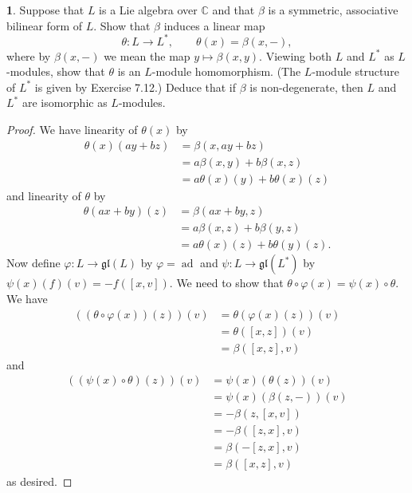\documentclass[12pt]{article}
\DeclareMathOperator{\ad}{ad}
\newcommand{\gl}{\mathfrak{gl}}
\theoremstyle{definition}
\newtheorem{ex}{}
\begin{document}
\begin{ex}
	Suppose that $L$ is a Lie algebra over $\mathbb{C}$ and that $\beta$ is a symmetric, associative bilinear form of $L$.
	Show that $\beta$ induces a linear map \begin{equation*}
		\theta : L \to L^*, \hspace{2em} \theta(x) = \beta(x, -),
	\end{equation*}
	where by $\beta(x, -)$ we mean the map $y \mapsto \beta(x, y)$.
	Viewing both $L$ and $L^*$ as $L$-modules, show that $\theta$ is an $L$-module homomorphism.
	(The $L$-module structure of $L^*$ is given by Exercise 7.12.)
	Deduce that if $\beta$ is non-degenerate, then $L$ and $L^*$ are isomorphic as $L$-modules.
\end{ex}
\begin{proof}
  We have linearity of $\theta(x)$ by \begin{align*}
    \theta(x)(a y + b z) & = \beta(x, a y + b z)                  \\
                                  & = a\beta(x, y) + b\beta(x, z) \\
                                  & = a\theta(x)(y) + b\theta(x)(z)
  \end{align*}
  and linearity of $\theta$ by \begin{align*}
    \theta(ax + by)(z) & = \beta(ax + by, z) \\
                       & = a\beta(x, z) + b\beta(y, z) \\
                       & = a\theta(x)(z) + b\theta(y)(z).
  \end{align*}
  Now define $\varphi : L \to \gl(L)$ by $\varphi = \ad$ and $\psi : L \to \gl(L^*)$ by $\psi(x)(f)(v) = -f([x, v])$.
  We need to show that $\theta \circ \varphi(x) = \psi(x) \circ \theta$.
  We have \begin{align*}
    ((\theta \circ \varphi(x))(z))(v) & = \theta(\varphi(x)(z))(v) \\
                                      & = \theta([x, z])(v) \\
                                      & = \beta([x, z], v)
  \end{align*}
  and \begin{align*}
    ((\psi(x) \circ \theta)(z))(v) & = \psi(x)(\theta(z))(v) \\
                                   & = \psi(x)(\beta(z, -))(v) \\
                                   & = -\beta(z, [x, v]) \\
                                   & = -\beta([z, x], v) \\
                                   & = \beta(-[z, x], v) \\
                                   & = \beta([x, z], v)
  \end{align*}
  as desired.


\end{proof}
\end{document}
